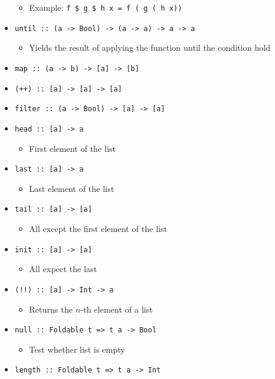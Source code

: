 \begin{itemize}
\begin{itemize}
            \item Example: \verb+f $ g $ h x = f ( g ( h x))+
        \end{itemize}
    \item \verb+until :: (a -> Bool) -> (a -> a) -> a -> a+
        \begin{itemize}
            \item Yields the result of applying the function until the condition hold
        \end{itemize}
    \item \verb+map :: (a -> b) -> [a] -> [b]+
    \item \verb|(++) :: [a] -> [a] -> [a]|
    \item \verb+filter :: (a -> Bool) -> [a] -> [a]+
    \item \verb+head :: [a] -> a+
        \begin{itemize}
            \item First element of the list
        \end{itemize}
    \item \verb+last :: [a] -> a+
        \begin{itemize}
            \item Last element of the list
        \end{itemize}
    \item \verb+tail :: [a] -> [a]+
        \begin{itemize}
            \item All except the first element of the list
        \end{itemize}
    \item \verb+init :: [a] -> [a]+
        \begin{itemize}
            \item All expect the last
        \end{itemize}
    \item \verb+(!!) :: [a] -> Int -> a+
        \begin{itemize}
            \item Returns the $n$-th element of a list
        \end{itemize}
    \item \verb+null :: Foldable t => t a -> Bool+
        \begin{itemize}
            \item Test whether list is empty
        \end{itemize}
    \item \verb+length :: Foldable t => t a -> Int+

\end{itemize}
